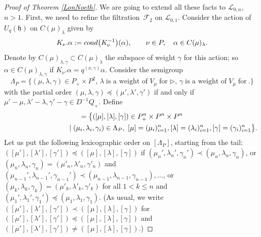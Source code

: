 \documentclass[11pt]{article}
\numberwithin{equation}{section}
\numberwithin{equation}{section}
\theoremstyle{definition}
\newcommand{\Ll}{{\mathcal L}}
\begin{document}
\begin{proof}[Proof of Theorem \ref{LonNoeth}]
We are going to extend all these facts to $\Ll_{0,n}$, $n>1$. First, we need to refine the filtration~${\mathcal F}_2$ on $\Ll_{0,1}$. Consider the action of $U_q({\mathfrak h})$ on $C(\mu)_{\lambda}$ given by
\begin{equation}\label{coadweightnew}
K_\nu.\alpha := {\rm coad}\big(K_\nu^{-1}\big)(\alpha),\qquad \nu\in P, \quad \alpha \in C(\mu)_{\lambda}.
\end{equation}
Denote by $C(\mu)_{\lambda,\gamma} \subset C(\mu)_{\lambda}$ the subspace of weight $\gamma$ for
this action; so $\alpha \in C(\mu)_{\lambda,\gamma}$ if $K_\nu.\alpha= q^{(\nu,\gamma)}\alpha$.
Consider the semigroup
\[\Lambda_P=\{(\mu, \lambda,\gamma)\in P_+\times P^2, \, \lambda \;\text{is a weight of}\;V_\mu \;\text{for} \; \rhd ,\, \gamma \;\text{is a weight of}\;V_\mu \;\text{for}\ . \}\]
with the partial order $(\mu,\lambda,\gamma)\preceq (\mu', \lambda',\gamma')$ if and only if $\mu'-\mu,\lambda'-\lambda,\gamma'-\gamma\in D^{-1}Q_+$. Define
\begin{gather*}
[\Lambda_P] =\bigl\lbrace([\mu],[\lambda],[\gamma])\in P_+^n\times P^n\times P^n \\
\hphantom{[\Lambda_P] =\bigl\lbrace([\mu],[\lambda],[\gamma]}{} \mid (\mu_i,\lambda_i,\gamma_i)\in \Lambda_P,\ [\mu] = (\mu_i)_{i=1}^n, [\lambda] = (\lambda_i)_{i=1}^n, [\gamma]=(\gamma_i)_{i=1}^n\bigr\rbrace .
\end{gather*}
Let us put the following lexicographic order on $ [\Lambda_P]$, starting from the tail: $([\mu'],[\lambda'],[\gamma'])\preceq ([\mu], [\lambda],[\gamma])$ if $(\mu_n',\lambda_n',\gamma_n')\prec (\mu_n, \lambda_n,\gamma_n)$, or $(\mu_n,\lambda_n,\gamma_n)= (\mu'_n, \lambda'_n,\gamma'_n)$ and $(\mu_{n-1}',\lambda_{n-1}',\gamma_{n-1}')\prec (\mu_{n-1}, \lambda_{n-1},\gamma_{n-1}),\dots$, or $(\mu_k,\lambda_k,\gamma_k)= (\mu'_k, \lambda'_k,\gamma'_k)$ for all $1< k\leq n$ and $(\mu_1',\lambda_1',\gamma_1')\preceq (\mu_1, \lambda_1,\gamma_1)$. (As usual, we write $([\mu'],[\lambda'],[\gamma'])\prec ([\mu], [\lambda],[\gamma])$ for $([\mu'],[\lambda'],[\gamma'])\preceq ([\mu], [\lambda],[\gamma])$ and $([\mu'],[\lambda'],[\gamma'])\ne ([\mu], [\lambda],[\gamma])$.)


\end{proof}
\end{document}
